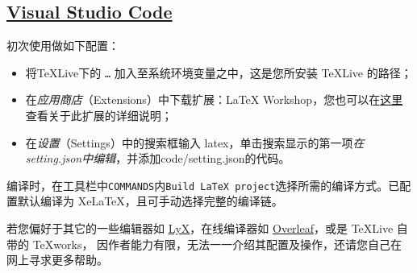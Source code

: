 		\subsection{\href{https://code.visualstudio.com}{Visual Studio Code}}
		初次使用做如下配置：
		\begin{itemize}
			\item 将\TeX{}Live下的 \texttt{\dots {}} 加入至系统环境变量之中，这是您所安装 \TeX{}Live 的路径；
			\item 在\emph{应用商店}（Extensions）中下载扩展：\textsf{LaTeX Workshop}，您也可以在\href{https://github.com/James-Yu/LaTeX-Workshop}{这里}查看关于此扩展的详细说明；
			\item 在\emph{设置}（Settings）中的搜索框输入 latex，单击搜索显示的第一项\emph{在setting.json中编辑}，并添加\textsf{code/setting.json}的代码。
		\end{itemize}
		
		编译时，在工具栏中\texttt{COMMANDS}内\texttt{Build LaTeX project}选择所需的编译方式。已配置默认编译为 XeLaTeX，且可手动选择完整的编译链。

		若您偏好于其它的一些编辑器如 \href{http://www.lyx.org/}{LyX}，在线编译器如 \href{https://www.overleaf.com/}{Overleaf}，或是 \TeX{}Live 自带的 TeXworks， 因作者能力有限，无法一一介绍其配置及操作，还请您自己在网上寻求更多帮助。